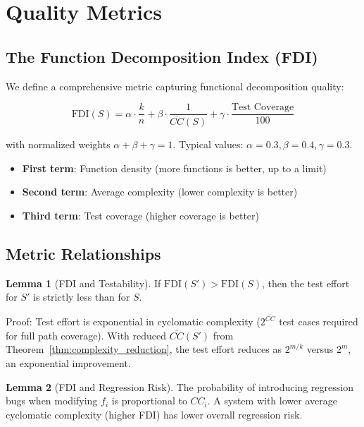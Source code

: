 \documentclass[a4paper,12pt]{article}
\theoremstyle{definition}
\newtheorem{lemma}{Lemma}
\begin{document}
\section{Quality Metrics}

\subsection{The Function Decomposition Index (FDI)}

We define a comprehensive metric capturing functional decomposition quality:

\[
\mathrm{FDI}(S) = \alpha \cdot \frac{k}{n} + \beta \cdot \frac{1}{\overline{CC}(S)} + \gamma \cdot \frac{\text{Test Coverage}}{100}
\]

with normalized weights $\alpha + \beta + \gamma = 1$. Typical values: $\alpha = 0.3, \beta = 0.4, \gamma = 0.3$.

\begin{itemize}
	\item \textbf{First term}: Function density (more functions is better, up to a limit)
	\item \textbf{Second term}: Average complexity (lower complexity is better)
	\item \textbf{Third term}: Test coverage (higher coverage is better)
\end{itemize}

\subsection{Metric Relationships}

\begin{lemma}[FDI and Testability]
If $\mathrm{FDI}(S') > \mathrm{FDI}(S)$, then the test effort for $S'$ is strictly less than for $S$.

Proof: Test effort is exponential in cyclomatic complexity ($2^{\overline{CC}}$ test cases required for full path coverage). With reduced $\overline{CC}(S')$ from Theorem~\ref{thm:complexity_reduction}, the test effort reduces as $2^{m/k}$ versus $2^m$, an exponential improvement. \qedhere
\end{lemma}

\begin{lemma}[FDI and Regression Risk]
The probability of introducing regression bugs when modifying $f_i$ is proportional to $CC_i$. A system with lower average cyclomatic complexity (higher FDI) has lower overall regression risk. \qedhere
\end{lemma}
\end{document}
